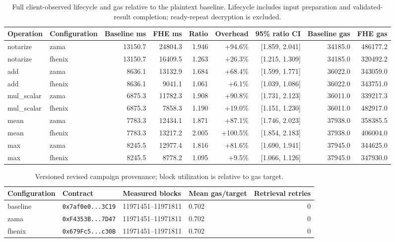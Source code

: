 \begin{table}[!t]
\centering\footnotesize
\caption{Full client-observed lifecycle and gas relative to the plaintext baseline. Lifecycle includes input preparation and validated-result completion; ready-repeat decryption is excluded.}
\label{tab:lifecycle-relative-baseline}
\begin{tabular}{llrrrrrrr}
\hline
Operation & Configuration & Baseline ms & FHE ms & Ratio & Overhead & 95\% ratio CI & Baseline gas & FHE gas \\
\hline
notarize & zama & 13150.7 & 24804.3 & 1.946 & +94.6\% & [1.859, 2.041] & 34185.0 & 486177.2 \\
notarize & fhenix & 13150.7 & 16409.5 & 1.263 & +26.3\% & [1.215, 1.309] & 34185.0 & 320492.2 \\
add & zama & 8636.1 & 13132.9 & 1.684 & +68.4\% & [1.599, 1.771] & 36022.0 & 343059.0 \\
add & fhenix & 8636.1 & 9041.1 & 1.061 & +6.1\% & [1.039, 1.086] & 36022.0 & 343751.0 \\
mul\_scalar & zama & 6875.3 & 11782.3 & 1.908 & +90.8\% & [1.731, 2.123] & 36011.0 & 339217.3 \\
mul\_scalar & fhenix & 6875.3 & 7858.3 & 1.190 & +19.0\% & [1.151, 1.230] & 36011.0 & 482917.0 \\
mean & zama & 7783.3 & 12434.1 & 1.871 & +87.1\% & [1.746, 2.023] & 37938.0 & 358385.5 \\
mean & fhenix & 7783.3 & 13217.2 & 2.005 & +100.5\% & [1.854, 2.183] & 37938.0 & 406004.0 \\
max & zama & 8245.5 & 12977.4 & 1.816 & +81.6\% & [1.690, 1.941] & 37945.0 & 344625.0 \\
max & fhenix & 8245.5 & 8778.2 & 1.095 & +9.5\% & [1.066, 1.126] & 37945.0 & 347930.0 \\
\hline
\end{tabular}
\end{table}

\begin{table}[!t]
\centering\footnotesize
\caption{Versioned revised campaign provenance; block utilization is relative to gas target.}
\label{tab:lifecycle-provenance}
\begin{tabular}{llllr}
\hline
Configuration & Contract & Measured blocks & Mean gas/target & Retrieval retries \\
\hline
baseline & \texttt{0x7af0e0...3C19} & 11971451--11971811 & 0.702 & 0 \\
zama & \texttt{0xF4353B...7D47} & 11971451--11971811 & 0.702 & 0 \\
fhenix & \texttt{0x679Fc5...c30B} & 11971451--11971811 & 0.702 & 0 \\
\hline
\end{tabular}
\end{table}

